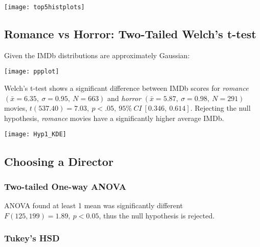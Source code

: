 \documentclass[11pt]{article}
\begin{document}
\pagebreak
\begin{center}
    \vspace*{-0.375cm}
    \texttt{[image: top5histplots]}
\end{center}

\pagebreak
\subsection{Romance vs Horror: Two-Tailed Welch's t-test}

Given the IMDb distributions are approximately Gaussian:

\begin{center}
    \texttt{[image: ppplot]}
\end{center}

Welch’s t-test shows a significant difference between IMDb scores for \emph{romance} $(\bar{x} = 6.35,~\sigma = 0.95,~N = 663)$ and \emph{horror} $(\bar{x} = 5.87,~\sigma = 0.98,~N = 291)$ movies, $t(537.40) = 7.03,~p < .05,~95\%~CI~[0.346,~0.614]$. Rejecting the null hypothesis, \emph{romance} movies have a significantly higher average IMDb.

\begin{center}
    \texttt{[image: Hyp1\_KDE]}
\end{center}

\pagebreak
\subsection{Choosing a Director}

\subsubsection{Two-tailed One-way ANOVA}

ANOVA found at least 1 mean was significantly different $F(125, 199) = 1.89,~p < 0.05$, thus the null hypothesis is rejected.

\subsubsection{Tukey's HSD}
\end{document}
